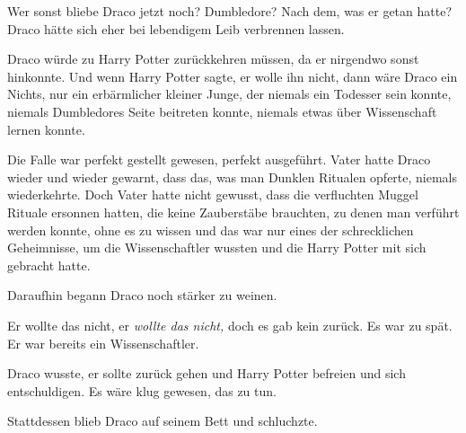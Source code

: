 Wer sonst bliebe Draco jetzt noch? Dumbledore? Nach dem, was er getan hatte? Draco hätte sich eher bei lebendigem Leib verbrennen lassen.

Draco würde zu Harry Potter zurückkehren müssen, da er nirgendwo sonst hinkonnte. Und wenn Harry Potter sagte, er wolle ihn nicht, dann wäre Draco ein Nichts, nur ein erbärmlicher kleiner Junge, der niemals ein Todesser sein konnte, niemals Dumbledores Seite beitreten konnte, niemals etwas über Wissenschaft lernen konnte.

Die Falle war perfekt gestellt gewesen, perfekt ausgeführt. Vater hatte Draco wieder und wieder gewarnt, dass das, was man Dunklen Ritualen opferte, niemals wiederkehrte. Doch Vater hatte nicht gewusst, dass die verfluchten Muggel Rituale ersonnen hatten, die keine Zauberstäbe brauchten, zu denen man verführt werden konnte, ohne es zu wissen und das war nur eines der schrecklichen Geheimnisse, um die Wissenschaftler wussten und die Harry Potter mit sich gebracht hatte.

Daraufhin begann Draco noch stärker zu weinen.

Er wollte das nicht, er \emph{wollte das nicht,} doch es gab kein zurück. Es war zu spät. Er war bereits ein Wissenschaftler.

Draco wusste, er sollte zurück gehen und Harry Potter befreien und sich entschuldigen. Es wäre klug gewesen, das zu tun.

Stattdessen blieb Draco auf seinem Bett und schluchzte.

